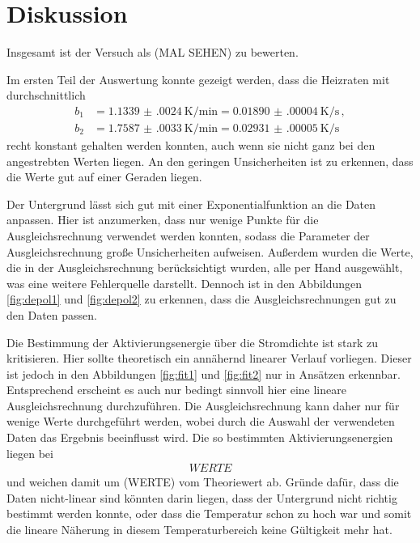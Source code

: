 \section{Diskussion}
\label{sec:Diskussion}

Insgesamt ist der Versuch als (MAL SEHEN) zu bewerten.

Im ersten Teil der Auswertung konnte gezeigt werden, dass die Heizraten mit
durchschnittlich
\begin{align*}
  b_1&=\SI{1.1339(0024)}{\kelvin\per\minute}= \SI{0.01890(00004)}{\kelvin\per\second}\,, \\
  b_2&=\SI{1.7587(0033)}{\kelvin\per\minute}= \SI{0.02931(00005)}{\kelvin\per\second}\,
\end{align*}
recht konstant gehalten werden konnten, auch wenn sie nicht ganz bei den angestrebten
Werten liegen. An den geringen Unsicherheiten ist zu erkennen, dass die Werte gut auf einer
Geraden liegen.

Der Untergrund lässt sich gut mit einer Exponentialfunktion an die Daten anpassen.
Hier ist anzumerken, dass nur wenige Punkte für die Ausgleichsrechnung verwendet
werden konnten, sodass die Parameter der Ausgleichsrechnung große Unsicherheiten
aufweisen. Außerdem wurden die Werte, die in der Ausgleichsrechnung berücksichtigt wurden,
alle per Hand ausgewählt, was eine weitere Fehlerquelle darstellt. Dennoch ist in den
Abbildungen \ref{fig:depol1} und \ref{fig:depol2} zu erkennen, dass die Ausgleichsrechnungen
gut zu den Daten passen.

Die Bestimmung der Aktivierungsenergie über die Stromdichte ist stark zu kritisieren.
Hier sollte theoretisch ein annähernd linearer Verlauf vorliegen. Dieser ist jedoch
in den Abbildungen \ref{fig:fit1} und \ref{fig:fit2} nur in Ansätzen erkennbar.
Entsprechend erscheint es auch nur bedingt sinnvoll hier eine lineare Ausgleichsrechnung
durchzuführen. Die Ausgleichsrechnung kann daher nur für wenige Werte durchgeführt
werden, wobei durch die Auswahl der verwendeten Daten das Ergebnis beeinflusst
wird. Die so bestimmten Aktivierungsenergien liegen bei
\begin{align}
  WERTE
\end{align}
und weichen damit um (WERTE) vom Theoriewert ab.
Gründe dafür, dass die Daten nicht-linear sind könnten darin liegen, dass der Untergrund
nicht richtig bestimmt werden konnte, oder dass die Temperatur schon zu hoch war und somit
die lineare Näherung in diesem Temperaturbereich keine Gültigkeit mehr hat.
